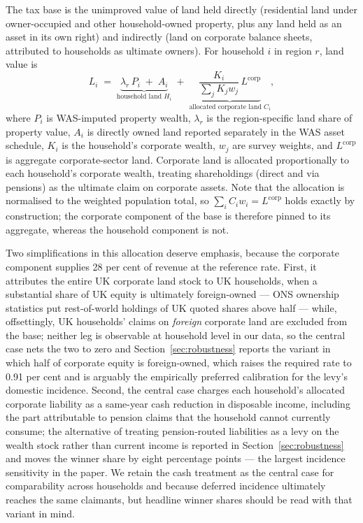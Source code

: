 The tax base is the unimproved value of land held directly (residential land under owner-occupied and other household-owned property, plus any land held as an asset in its own right) and indirectly (land on corporate balance sheets, attributed to households as ultimate owners). For household $i$ in region $r$, land value is
\begin{equation}
L_i \;=\; \underbrace{\lambda_r \, P_i \;+\; A_i}_{\text{household land } H_i} \;+\; \underbrace{\frac{K_i}{\sum_j K_j w_j} \, L^{\mathrm{corp}}}_{\text{allocated corporate land } C_i},
\label{eq:land}
\end{equation}
where $P_i$ is WAS-imputed property wealth, $\lambda_r$ is the region-specific land share of property value, $A_i$ is directly owned land reported separately in the WAS asset schedule, $K_i$ is the household's corporate wealth, $w_j$ are survey weights, and $L^{\mathrm{corp}}$ is aggregate corporate-sector land. Corporate land is allocated proportionally to each household's corporate wealth, treating shareholdings (direct and via pensions) as the ultimate claim on corporate assets. Note that the allocation is normalised to the weighted population total, so $\sum_i C_i w_i = L^{\mathrm{corp}}$ holds exactly by construction; the corporate component of the base is therefore pinned to its aggregate, whereas the household component is not.

Two simplifications in this allocation deserve emphasis, because the corporate component supplies 28 per cent of revenue at the reference rate. First, it attributes the entire UK corporate land stock to UK households, when a substantial share of UK equity is ultimately foreign-owned --- ONS ownership statistics put rest-of-world holdings of UK quoted shares above half --- while, offsettingly, UK households' claims on \emph{foreign} corporate land are excluded from the base; neither leg is observable at household level in our data, so the central case nets the two to zero and Section~\ref{sec:robustness} reports the variant in which half of corporate equity is foreign-owned, which raises the required rate to 0.91 per cent and is arguably the empirically preferred calibration for the levy's domestic incidence. Second, the central case charges each household's allocated corporate liability as a same-year cash reduction in disposable income, including the part attributable to pension claims that the household cannot currently consume; the alternative of treating pension-routed liabilities as a levy on the wealth stock rather than current income is reported in Section~\ref{sec:robustness} and moves the winner share by eight percentage points --- the largest incidence sensitivity in the paper. We retain the cash treatment as the central case for comparability across households and because deferred incidence ultimately reaches the same claimants, but headline winner shares should be read with that variant in mind.

